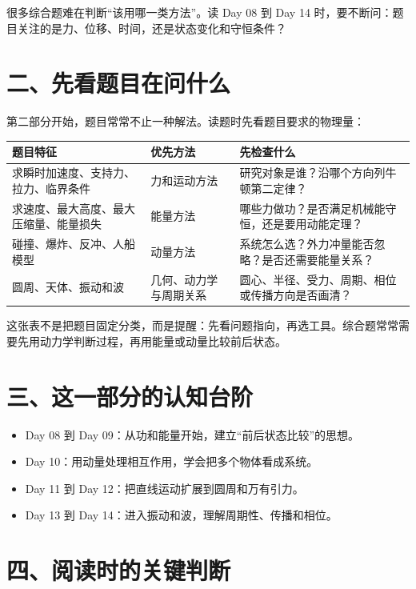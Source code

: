 很多综合题难在判断“该用哪一类方法”。读 Day 08 到 Day 14 时，要不断问：题目关注的是力、位移、时间，还是状态变化和守恒条件？

\section*{二、先看题目在问什么}

第二部分开始，题目常常不止一种解法。读题时先看题目要求的物理量：

\begin{center}
\begin{tabular}{p{}p{}p{}}
\toprule
\textbf{题目特征} & \textbf{优先方法} & \textbf{先检查什么} \\
\midrule
求瞬时加速度、支持力、拉力、临界条件 & 力和运动方法 & 研究对象是谁？沿哪个方向列牛顿第二定律？ \\
求速度、最大高度、最大压缩量、能量损失 & 能量方法 & 哪些力做功？是否满足机械能守恒，还是要用动能定理？ \\
碰撞、爆炸、反冲、人船模型 & 动量方法 & 系统怎么选？外力冲量能否忽略？是否还需要能量关系？ \\
圆周、天体、振动和波 & 几何、动力学与周期关系 & 圆心、半径、受力、周期、相位或传播方向是否画清？ \\
\bottomrule
\end{tabular}
\end{center}

这张表不是把题目固定分类，而是提醒：先看问题指向，再选工具。综合题常常需要先用动力学判断过程，再用能量或动量比较前后状态。

\section*{三、这一部分的认知台阶}

\begin{itemize}[itemsep=0.2em]
  \item Day 08 到 Day 09：从功和能量开始，建立“前后状态比较”的思想。
  \item Day 10：用动量处理相互作用，学会把多个物体看成系统。
  \item Day 11 到 Day 12：把直线运动扩展到圆周和万有引力。
  \item Day 13 到 Day 14：进入振动和波，理解周期性、传播和相位。
\end{itemize}

\section*{四、阅读时的关键判断}

